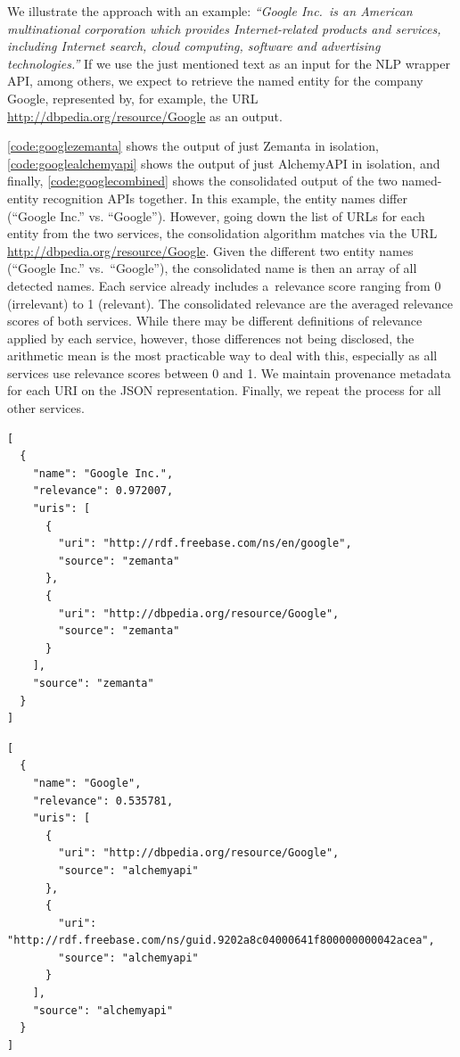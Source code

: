 We illustrate the approach with an example:
\textit{``Google Inc.\ is an American multinational corporation
which provides Internet-related products and services,
including Internet search, cloud computing, software and 
advertising technologies.''}
If we use the just mentioned text
as an input for the NLP wrapper API,
among others, we expect to retrieve the named entity for the
company Google, represented by, for example, the URL
\url{http://dbpedia.org/resource/Google} as an output.

\autoref{code:googlezemanta} shows the output
of just Zemanta in isolation,
\autoref{code:googlealchemyapi} shows the output
of just AlchemyAPI in isolation,
and finally, \autoref{code:googlecombined} shows the consolidated
output of the two named-entity recognition APIs together. 
In this example, the entity names differ (``Google Inc.''
vs. ``Google''). However, going down the list of URLs for
each entity from the two services, the consolidation algorithm
matches via the URL \url{http://dbpedia.org/resource/Google}.
Given the different two entity names (``Google Inc.'' vs.\
``Google''), the consolidated name is then an array of all
detected names.
Each service already includes a~relevance score ranging from
0 (irrelevant) to 1 (relevant).
The consolidated relevance are the
averaged relevance scores of both services.
While there may be different definitions of relevance
applied by each service, however,
those differences not being disclosed,
the arithmetic mean is the most practicable way to deal with this,
especially as all services use relevance scores between 0 and 1.
We maintain provenance metadata for each URI
on the JSON representation.
Finally, we repeat the process for all other services.

\newpage

\begin{lstlisting}[caption={Output of Zemanta in isolation.},
  label={code:googlezemanta}]
[
  {
    "name": "Google Inc.",
    "relevance": 0.972007,
    "uris": [
      {
        "uri": "http://rdf.freebase.com/ns/en/google",
        "source": "zemanta"
      },
      {
        "uri": "http://dbpedia.org/resource/Google",
        "source": "zemanta"
      }
    ],
    "source": "zemanta"
  }
]
\end{lstlisting}

\begin{lstlisting}[caption={Output of AlchemyAPI in isolation.},
  label={code:googlealchemyapi}]
[
  {
    "name": "Google",
    "relevance": 0.535781,
    "uris": [
      {
        "uri": "http://dbpedia.org/resource/Google",
        "source": "alchemyapi"
      },
      {
        "uri": "http://rdf.freebase.com/ns/guid.9202a8c04000641f800000000042acea",
        "source": "alchemyapi"
      }
    ],
    "source": "alchemyapi"
  }
]
\end{lstlisting}


